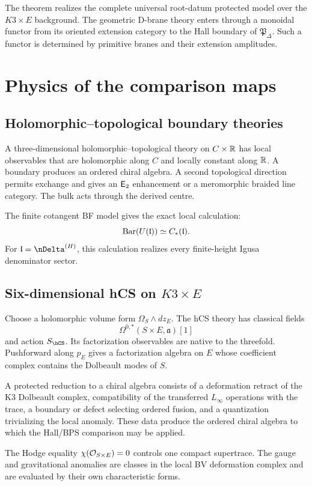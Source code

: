 The theorem realizes the complete universal root-datum protected model over the $K3\times E$ background.  The geometric D-brane theory enters through a monoidal functor from its oriented extension category to the Hall boundary of $\mathfrak P_\Delta$.  Such a functor is determined by primitive branes and their extension amplitudes.


\part[Physics]{Physics of the comparison maps}

\chapter{Holomorphic--topological boundary theories}
A three-dimensional holomorphic--topological theory on $C\times\mathbb R$ has local observables that are holomorphic along $C$ and locally constant along $\mathbb R$. A boundary produces an ordered chiral algebra. A second topological direction permits exchange and gives an $\mathsf E_2$ enhancement or a meromorphic braided line category. The bulk acts through the derived centre.

The finite cotangent BF model gives the exact local calculation:
\[
 \operatorname{Bar}(U(\mathfrak l))\simeq C_*(\mathfrak l).
\]
For $\mathfrak l=\nDelta^{(H)}$, this calculation realizes every finite-height Igusa denominator sector.

\chapter{Six-dimensional hCS on \texorpdfstring{$K3\times E$}{K3 x E}}
Choose a holomorphic volume form $\Omega_S\wedge dz_E$. The hCS theory has classical fields
\[
 \Omega^{0,*}(S\times E,\mathfrak a)[1]
\]
and action $S_{\hCS}$. Its factorization observables are native to the threefold. Pushforward along $p_E$ gives a factorization algebra on $E$ whose coefficient complex contains the Dolbeault modes of $S$.

A protected reduction to a chiral algebra consists of a deformation retract of the K3 Dolbeault complex, compatibility of the transferred $L_\infty$ operations with the trace, a boundary or defect selecting ordered fusion, and a quantization trivializing the local anomaly. These data produce the ordered chiral algebra to which the Hall/BPS comparison may be applied.

The Hodge equality $\chi(\mathcal O_{S\times E})=0$ controls one compact supertrace. The gauge and gravitational anomalies are classes in the local BV deformation complex and are evaluated by their own characteristic forms.


